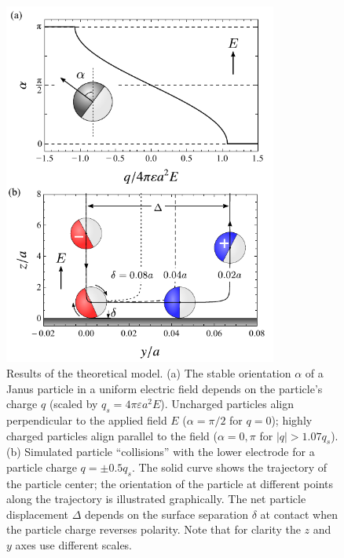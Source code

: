 \begin{figure}[p]
\centering
\includegraphics[width=9cm]{figures/2_4.pdf}
\caption{Results of the theoretical model. (a) The stable orientation $\alpha$ of a Janus particle in a uniform electric field depends on the particle's charge $q$ (scaled by $q_s = 4\pi\varepsilon a^2 E$). Uncharged particles align perpendicular to the applied field $E$ ($\alpha=\pi/2$ for $q=0$); highly charged particles align parallel to the field ($\alpha=0,\pi$ for $|q|>1.07 q_s$). (b) Simulated particle ``collisions'' with the lower electrode for a particle charge $q=\pm0.5q_s$. The solid curve shows the trajectory of the particle center; the orientation of the particle at different points along the trajectory is illustrated graphically. The net particle displacement $\Delta$ depends on the surface separation $\delta$ at contact when the particle charge reverses polarity. Note that for clarity the $z$ and $y$ axes use different scales.}
\label{fig:2.4}
\end{figure}

